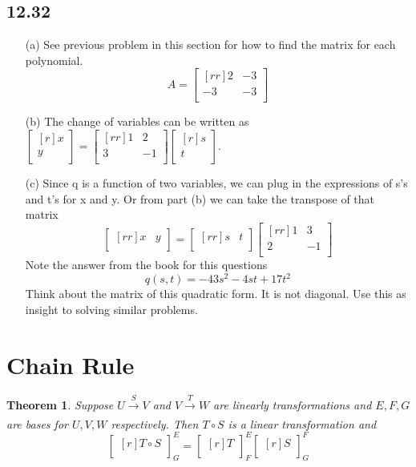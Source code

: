 \documentclass{report}
\newtheorem*{thrm}{Theorem}
\begin{document}
\subsection{12.32}
\begin{enumerate}
\item[(a)] See previous problem in this section for how to find the matrix for each polynomial.
\[ A=\begin{bmatrix}[rr]2&-3\\-3&-3\\\end{bmatrix} \]
\item[(b)] The change of variables can be written as $\begin{bmatrix}[r]x\\y\\\end{bmatrix}=\begin{bmatrix}[rr]1&2\\3&-1\\\end{bmatrix}\begin{bmatrix}[r]s\\t\\\end{bmatrix}$.
\item[(c)]Since q is a function of two variables, we can plug in the expressions of s's and t's for x and y. Or from part (b) we can take the transpose of that matrix
\[ \begin{bmatrix}[rr]x&y\\\end{bmatrix}=\begin{bmatrix}[rr]s&t\\\end{bmatrix}\begin{bmatrix}[rr]1&3\\2&-1\\\end{bmatrix} \]
Note the answer from the book for this questions
\[ q(s,t)=-43s^2-4st+17t^2\]
Think about the matrix of this quadratic form. It is not diagonal. Use this as insight to solving similar problems.
\end{enumerate}

\section{Chain Rule}
\begin{thrm}
Suppose $U\xrightarrow[]{S} V$ and $V\xrightarrow[]{T} W$ are linearly transformations and $E,F,G$ are bases for $U,V,W$ respectively. Then $T\circ S$ is a linear transformation and 
\[ \begin{bmatrix}[r]T\circ S\\\end{bmatrix}_G^E = \begin{bmatrix}[r]T\\\end{bmatrix}_F^E \begin{bmatrix}[r]S\\\end{bmatrix}_G^F \]
\end{thrm}
\end{document}
